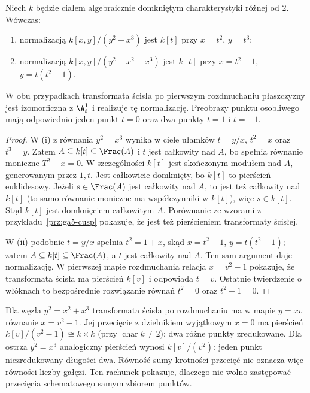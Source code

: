\begin{stwierdzenie}
\label{st:ga5-normalization}
Niech $k$ będzie ciałem algebraicznie domkniętym
charakterystyki różnej od $2$. Wówczas:
\begin{enumerate}[label=(\roman*)]
\item normalizacją $k[x,y]/(y^2-x^3)$ jest $k[t]$
przy $x=t^2$, $y=t^3$;
\item normalizacją $k[x,y]/(y^2-x^2-x^3)$ jest
$k[t]$ przy $x=t^2-1$, $y=t(t^2-1)$.
\end{enumerate}
W obu przypadkach transformata ścisła po pierwszym
rozdmuchaniu płaszczyzny jest izomorficzna z $\A^1_t$
i realizuje tę normalizację. Preobrazy punktu osobliwego
mają odpowiednio jeden punkt $t=0$ oraz dwa punkty
$t=1$ i $t=-1$.
\end{stwierdzenie}
\begin{proof}
W (i) z równania $y^2=x^3$ wynika w ciele ułamków
$t=y/x$, $t^2=x$ oraz $t^3=y$. Zatem
$A\subseteq k[t]\subseteq\Frac(A)$ i $t$ jest całkowity
nad $A$, bo spełnia równanie moniczne $T^2-x=0$.
W szczególności $k[t]$ jest skończonym modułem nad
$A$, generowanym przez $1,t$. Jest całkowicie
domknięty, bo $k[t]$ to pierścień euklidesowy.
Jeżeli $s\in\Frac(A)$ jest całkowity nad $A$, to jest
też całkowity nad $k[t]$ (to samo równanie moniczne
ma współczynniki w $k[t]$), więc $s\in k[t]$.
Stąd $k[t]$ jest domknięciem całkowitym $A$.
Porównanie ze wzorami z przykładu~\ref{prz:ga5-cusp}
pokazuje, że jest też pierścieniem transformaty ścisłej.

W (ii) podobnie $t=y/x$ spełnia $t^2=1+x$,
skąd $x=t^2-1$, $y=t(t^2-1)$; zatem
$A\subseteq k[t]\subseteq\Frac(A)$, a $t$ jest
całkowity nad $A$. Ten sam argument daje normalizację.
W pierwszej mapie rozdmuchania relacja
$x=v^2-1$ pokazuje, że transformata ścisła ma
pierścień $k[v]$ i odpowiada $t=v$.
Ostatnie twierdzenie o włóknach to bezpośrednie
rozwiązanie równań $t^2=0$ oraz $t^2-1=0$.
\end{proof}

\begin{przyklad}
Dla węzła $y^2=x^2+x^3$ transformata ścisła po
rozdmuchaniu ma w mapie $y=xv$ równanie
$x=v^2-1$. Jej przecięcie z dzielnikiem wyjątkowym
$x=0$ ma pierścień $k[v]/(v^2-1)\cong k\times k$
(przy $\operatorname{char}k\ne2$): dwa różne punkty
zredukowane. Dla ostrza $y^2=x^3$ analogiczny
pierścień wynosi $k[v]/(v^2)$: jeden punkt
niezredukowany długości dwa. Równość sumy krotności
przecięć nie oznacza więc równości liczby gałęzi.
Ten rachunek pokazuje, dlaczego nie wolno zastępować
przecięcia schematowego samym zbiorem punktów.
\end{przyklad}

